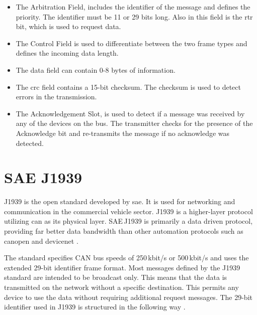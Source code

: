 \begin{itemize}
		\item The Arbitration Field, includes the identifier of the message and defines the priority. The identifier must be 11 or 29 bits long. Also in this field is the \acrfull{rtr} bit, which is used to request data.
		\item The Control Field is used to differentiate between the two frame types and defines the incoming data length.
		\item The data field can contain 0-8 bytes of information.
		\item The \acrshort{crc} field contains a 15-bit checksum. The checksum is used to detect errors in the transmission.
		\item The Acknowledgement Slot, is used to detect if a message was received by any of the devices on the bus. The transmitter checks for the presence of the Acknowledge bit and re-transmits the message if no acknowledge was detected.
\end{itemize}
\newpage

\section{SAE J1939}
J1939 is the open standard developed by \acrfull{sae}. It is used for networking and communication in the commercial vehicle sector. J1939 is a higher-layer protocol utilizing \acrshort{can} as its physical layer. SAE\,J1939 is primarily a data driven protocol, providing far better data bandwidth than other automation protocols such as \gls{canopen} and \gls{devicenet} \cite{introduction_sae_j1939_protocol}.

The standard specifies CAN bus speeds of 250\,kbit/s or 500\,kbit/s and uses the extended 29-bit identifier frame format. Most messages defined by the J1939 standard are intended to be broadcast only. This means that the data is transmitted on the network without a specific destination. This permits any device to use the data without requiring additional request messages. The 29-bit identifier used in J1939 is structured in the following way \cite{sae_j1939_introduction}. 

